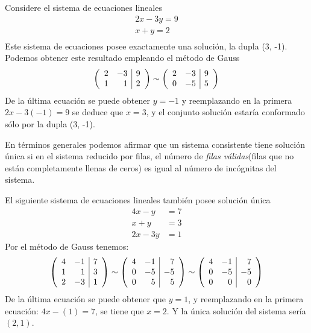 \begin{ejemplo}
Considere el sistema de ecuaciones lineales
\begin{align*}
2x-3y=9\\
x+y=2\\
\end{align*}
Este sistema de ecuaciones posee exactamente una solución, la dupla (3, -1). Podemos obtener este resultado empleando el método de Gauss
\begin{align*}
\reducir{rr|r}{
2&-3&9\\
1&1&2\\
}\sim
\reducir{rr|r}{
2&-3&9\\
0&-5&5\\
}
\end{align*}
De la última ecuación se puede obtener $y=-1$ y reemplazando en la primera $2x-3(-1)=9$ se deduce que $x=3$, y el conjunto solución estaría conformado sólo por la dupla (3, -1).
\end{ejemplo}


En términos generales podemos afirmar que un sistema consistente tiene solución única si en el sistema reducido por filas, el número de \textit{filas válidas}(filas que no están completamente llenas de ceros) es igual al número de incógnitas del sistema. 


\begin{ejemplo}
El siguiente sistema de ecuaciones lineales también posee solución única
\begin{align*}
4x-y&=7\\
x+y&=3\\
2x-3y&=1
\end{align*}
Por el método de Gauss tenemos:
\begin{align*}
\reducir{rr|r}{
4&-1&7\\
1&1&3\\
2&-3&1\\
}\sim
\reducir{rr|r}{
4&-1&7\\
0&-5&-5\\
0&5&5\\
}\sim
\reducir{rr|r}{
4&-1&7\\
0&-5&-5\\
0&0&0\\
}
\end{align*}
De la última ecuación se puede obtener que $y=1$, y reemplazando en la primera ecuación: $4x-(1)=7$, se tiene que $x=2$. Y la única solución del sistema sería $(2, 1)$.

\end{ejemplo}

